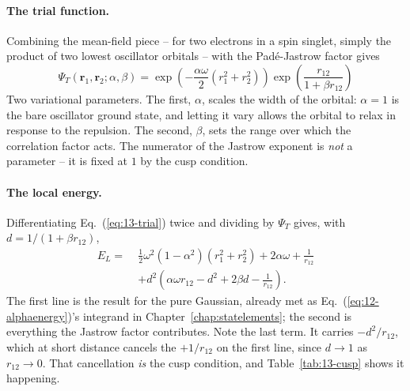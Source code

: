 \paragraph{The trial function.}
Combining the mean-field piece -- for two electrons in a spin singlet, simply
the product of two lowest oscillator orbitals -- with the Pad\'e-Jastrow
factor gives
\begin{equation}
  \boxed{\;
  \Psi_T(\bm{r}_1,\bm{r}_2;\alpha,\beta)
   = \exp\left(-\frac{\alpha\omega}{2}\left(r_1^2+r_2^2\right)\right)
     \exp\left(\frac{r_{12}}{1+\beta r_{12}}\right) \;}
  \label{eq:13-trial}
\end{equation}
Two variational parameters.  The first, $\alpha$, scales the width of the
orbital: $\alpha=1$ is the bare oscillator ground state, and letting it vary
allows the orbital to relax in response to the repulsion.  The second,
$\beta$, sets the range over which the correlation factor acts.  The numerator
of the Jastrow exponent is \emph{not} a parameter -- it is fixed at $1$ by the
cusp condition.

\paragraph{The local energy.}
Differentiating Eq.~(\ref{eq:13-trial}) twice and dividing by $\Psi_T$ gives,
with $d = 1/(1+\beta r_{12})$,
\begin{equation}
  \boxed{
  \begin{aligned}
    E_L =\;& \frac{1}{2}\omega^2\left(1-\alpha^2\right)
        \left(r_1^2+r_2^2\right) + 2\alpha\omega + \frac{1}{r_{12}}\\
      &+ d^2\left(\alpha\omega r_{12} - d^2 + 2\beta d
        - \frac{1}{r_{12}}\right).
  \end{aligned}}
  \label{eq:13-localenergydot}
\end{equation}
The first line is the result for the pure Gaussian, already met as
Eq.~(\ref{eq:12-alphaenergy})'s integrand in
Chapter~\ref{chap:statelements}; the second is everything the Jastrow factor
contributes.  Note the last term.  It carries $-d^2/r_{12}$, which at short
distance cancels the $+1/r_{12}$ on the first line, since $d\to1$ as
$r_{12}\to0$.  That cancellation \emph{is} the cusp condition, and
Table~\ref{tab:13-cusp} shows it happening.

